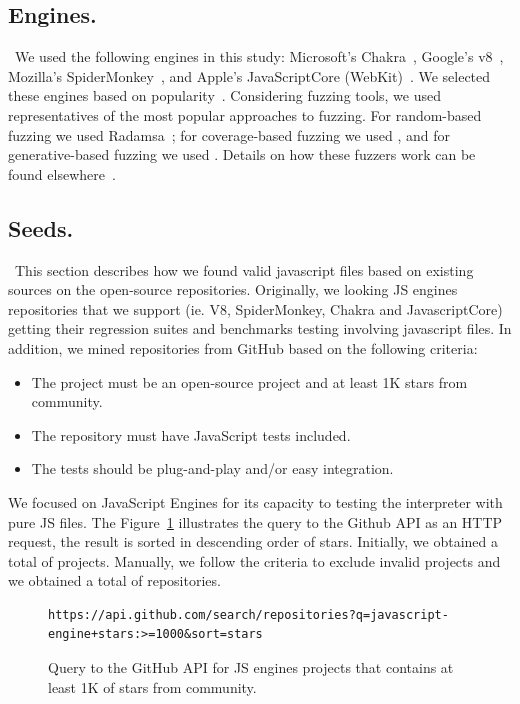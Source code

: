 \documentclass[10pt,conference,anonymous]{IEEEtran}
\begin{document}
\subsection{Engines.}~We used the following engines in
this study: Microsoft's Chakra~\cite{chakra2018repo}, Google's v8~\cite{v82018repo},
Mozilla's SpiderMonkey~\cite{spidermonkey2018repo}, and Apple's JavaScriptCore
(WebKit)~\cite{jsc2018repo}. We selected these engines based on
popularity~. Considering fuzzing tools, we used
representatives of the most popular approaches to fuzzing. For
random-based fuzzing we used Radamsa~\cite{radamsa}; for
coverage-based fuzzing we used
, and for
generative-based fuzzing we used
. Details on how these fuzzers work can
be found elsewhere~\cite{fuzz-bart}.

\subsection{Seeds.}~This section describes 
how we found valid javascript files based on 
existing sources on the open-source repositories.
Originally, we looking JS engines repositories that we 
support (ie. V8, SpiderMonkey, Chakra and JavascriptCore) getting
their regression suites and benchmarks testing involving javascript files.
In addition, we mined repositories from GitHub based on the following criteria:
\begin{itemize}
  \item The project must be an open-source project and at least 1K stars from community.
  \item The repository must have JavaScript tests included.
  \item The tests should be plug-and-play and/or easy integration.
\end{itemize}

We focused on JavaScript Engines for its capacity to testing the
interpreter with pure JS files. The Figure~\ref{fig:query} 
illustrates the query to the Github API as an HTTP request, the result 
is sorted in descending order of stars. Initially, we obtained
a total of  projects. Manually, we follow the criteria to exclude 
invalid projects and we obtained a total of  repositories.

\begin{figure}
  \centering
  \begin{lstlisting}
https://api.github.com/search/repositories?q=javascript-engine+stars:>=1000&sort=stars
  \end{lstlisting}
  \caption{\label{fig:query}
  Query to the GitHub API for JS engines projects that contains at least 1K of stars from community.
  }
\end{figure}
\end{document}

